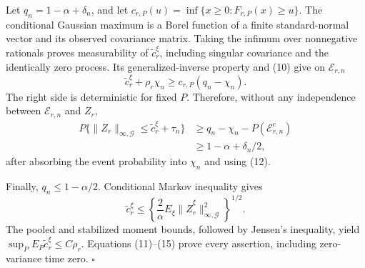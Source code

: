 Let \(q_n=1-\alpha+\delta_n\), and let
\(c_{r,P}(u)=\inf\{x\ge0:F_{r,P}(x)\ge u\}\). The conditional Gaussian maximum is a Borel function of a finite standard-normal vector and its observed covariance matrix. Taking the infimum over nonnegative rationals proves measurability of \(\widetilde c_r^\xi\), including singular covariance and the identically zero process. Its generalized-inverse property and (10) give on \(\mathcal E_{r,n}\)
\[
 \widetilde c_r^\xi+\rho_r\chi_n
 \ge c_{r,P}(q_n-\chi_n).                                 \tag{13}
\]
The right side is deterministic for fixed \(P\). Therefore, without any independence between \(\mathcal E_{r,n}\) and \(Z_r\),
\[
\begin{aligned}
 P\{\|Z_r\|_{\infty,\mathcal G}\le
 \widetilde c_r^\xi+\tau_n\}
 &\ge q_n-\chi_n-P(\mathcal E_{r,n}^c)\\
 &\ge1-\alpha+\delta_n/2,
\end{aligned}                                             \tag{14}
\]
after absorbing the event probability into \(\chi_n\) and using (12).

Finally, \(q_n\le1-\alpha/2\). Conditional Markov inequality gives
\[
 \widetilde c_r^\xi\le
 \left\{\frac2\alpha E_\xi
 \|\widehat Z_r^\xi\|_{\infty,\mathcal G}^2\right\}^{1/2}. \tag{15}
\]
The pooled and stabilized moment bounds, followed by Jensen's inequality, yield
\(\sup_PE_P\widetilde c_r^\xi\le C\rho_r\). Equations (11)--(15) prove every assertion, including zero-variance time zero. \(\square\)